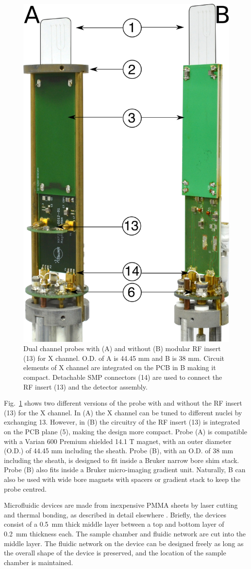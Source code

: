 \documentclass[preprint,5p]{elsarticle}
\newcommand{\fig}[1]{Fig.~\ref{#1}}
\begin{document}
\begin{figure}
\centering
\includegraphics[width=.5\linewidth,keepaspectratio=true]{./figures/ms5n17-tlp-im-181007-both-detectors.png}
\caption{Dual channel probes with (A) and without (B) modular RF insert (13) for X channel.
O.D. of A is 44.45 mm and B is 38 mm. Circuit elements of X channel are integrated on the
PCB in B making it compact. Detachable SMP connectors (14) are used to
connect the RF insert (13) and the detector assembly.}
\label{fig:ProbePhoto}
\end{figure}
\fig{fig:ProbePhoto} shows two different versions of the probe with and without the RF insert (13)
for the X channel. In (A) the X channel can be tuned to different nuclei by exchanging 13.
However, in (B) the circuitry of the RF insert (13) is integrated on the PCB plane (5),
making the design more compact.
 Probe (A) is compatible with a Varian 600 Premium shielded 14.1 T magnet, with an outer diameter (O.D.) of 44.45 mm including the sheath. Probe (B), with an
O.D. of 38 mm including the sheath, is designed to fit inside a
Bruker narrow bore shim stack.
Probe (B) also fits inside a Bruker micro-imaging gradient unit. Naturally, B can also be used with
wide bore magnets with spacers or gradient stack to keep the probe centred.

Microfluidic devices are made from inexpensive PMMA sheets by laser cutting and
thermal bonding, as described in detail elsewhere \cite{yilmaz_bonding}.
Briefly, the devices consist of a 0.5~mm thick middle layer between a  top and
bottom layer of 0.2~mm thickness each. The sample chamber and fluidic network
are cut into the middle layer. The fluidic network on the device can be designed
freely as long as the overall shape of the device is preserved, and the location
of the sample chamber is maintained.
\end{document}
